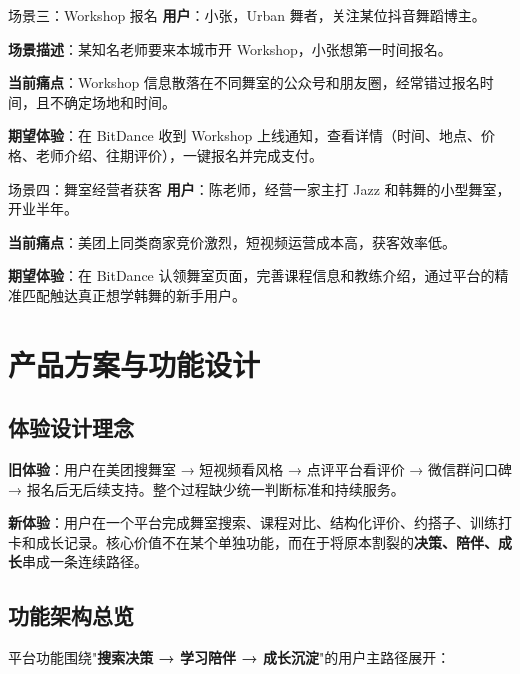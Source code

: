 \documentclass[12pt,a4paper]{ctexart}
\begin{document}
\begin{scenariobox}{场景三：Workshop 报名}
\textbf{用户}：小张，Urban 舞者，关注某位抖音舞蹈博主。

\textbf{场景描述}：某知名老师要来本城市开 Workshop，小张想第一时间报名。

\textbf{当前痛点}：Workshop 信息散落在不同舞室的公众号和朋友圈，经常错过报名时间，且不确定场地和时间。

\textbf{期望体验}：在 BitDance 收到 Workshop 上线通知，查看详情（时间、地点、价格、老师介绍、往期评价），一键报名并完成支付。
\end{scenariobox}

\begin{scenariobox}{场景四：舞室经营者获客}
\textbf{用户}：陈老师，经营一家主打 Jazz 和韩舞的小型舞室，开业半年。

\textbf{当前痛点}：美团上同类商家竞价激烈，短视频运营成本高，获客效率低。

\textbf{期望体验}：在 BitDance 认领舞室页面，完善课程信息和教练介绍，通过平台的精准匹配触达真正想学韩舞的新手用户。
\end{scenariobox}

\section{产品方案与功能设计}

\subsection{体验设计理念}

\textbf{旧体验}：用户在美团搜舞室 → 短视频看风格 → 点评平台看评价 → 微信群问口碑 → 报名后无后续支持。整个过程缺少统一判断标准和持续服务。

\textbf{新体验}：用户在一个平台完成舞室搜索、课程对比、结构化评价、约搭子、训练打卡和成长记录。核心价值不在某个单独功能，而在于将原本割裂的\textbf{决策、陪伴、成长}串成一条连续路径。

\subsection{功能架构总览}

平台功能围绕"\textbf{搜索决策 → 学习陪伴 → 成长沉淀}"的用户主路径展开：
\end{document}
